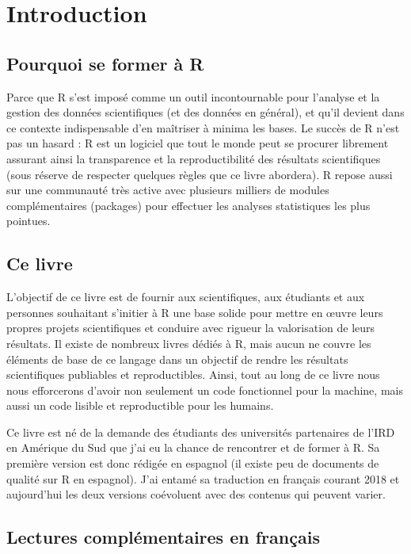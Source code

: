 \documentclass[
]{book}
\begin{document}
\hypertarget{intro}{%
\chapter{Introduction}\label{intro}}

\hypertarget{pourquoi-se-former-uxe0-r}{%
\section{Pourquoi se former à R}\label{pourquoi-se-former-uxe0-r}}

Parce que R s'est imposé comme un outil incontournable pour l'analyse et la gestion des données scientifiques (et des données en général), et qu'il devient dans ce contexte indispensable d'en maîtriser à minima les bases. Le succès de R n'est pas un hasard : R est un logiciel que tout le monde peut se procurer librement assurant ainsi la transparence et la reproductibilité des résultats scientifiques (sous réserve de respecter quelques règles que ce livre abordera). R repose aussi sur une communauté très active avec plusieurs milliers de modules complémentaires (packages) pour effectuer les analyses statistiques les plus pointues.

\hypertarget{ce-livre}{%
\section{Ce livre}\label{ce-livre}}

L'objectif de ce livre est de fournir aux scientifiques, aux étudiants et aux personnes souhaitant s'initier à R une base solide pour mettre en œuvre leurs propres projets scientifiques et conduire avec rigueur la valorisation de leurs résultats. Il existe de nombreux livres dédiés à R, mais aucun ne couvre les éléments de base de ce langage dans un objectif de rendre les résultats scientifiques publiables et reproductibles. Ainsi, tout au long de ce livre nous nous efforcerons d'avoir non seulement un code fonctionnel pour la machine, mais aussi un code lisible et reproductible pour les humains.

Ce livre est né de la demande des étudiants des universités partenaires de l'IRD en Amérique du Sud que j'ai eu la chance de rencontrer et de former à R. Sa première version est donc rédigée en espagnol (il existe peu de documents de qualité sur R en espagnol). J'ai entamé sa traduction en français courant 2018 et aujourd'hui les deux versions coévoluent avec des contenus qui peuvent varier.

\hypertarget{lectures-compluxe9mentaires-en-franuxe7ais}{%
\section{Lectures complémentaires en français}\label{lectures-compluxe9mentaires-en-franuxe7ais}}
\end{document}
